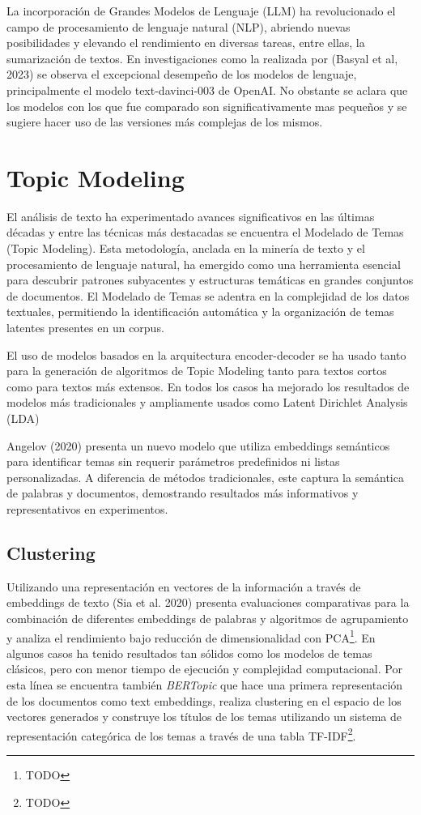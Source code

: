 La incorporación de Grandes Modelos de Lenguaje (LLM) ha revolucionado el campo de procesamiento de lenguaje natural (NLP), abriendo nuevas posibilidades y elevando el rendimiento en diversas tareas, entre ellas, la sumarización de textos. En investigaciones como la realizada por (Basyal et al, 2023)\cite{basyal2023text} se observa el excepcional desempeño de los modelos de lenguaje, principalmente el modelo text-davinci-003 de OpenAI\cite{openai}. No obstante se aclara que los modelos con los que fue comparado son significativamente mas peque\~nos y se sugiere hacer uso de las versiones más complejas de los mismos.

\section{Topic Modeling}

    El análisis de texto ha experimentado avances significativos en las últimas décadas y entre las técnicas más destacadas se encuentra el Modelado de Temas (Topic Modeling). Esta metodología, anclada en la minería de texto y el procesamiento de lenguaje natural, ha emergido como una herramienta esencial para descubrir patrones subyacentes y estructuras temáticas en grandes conjuntos de documentos. El Modelado de Temas se adentra en la complejidad de los datos textuales, permitiendo la identificación automática y la organización de temas latentes presentes en un corpus\cite{lda2003}.

    El uso de modelos basados en la arquitectura encoder-decoder se ha usado tanto para la generación de algoritmos de Topic Modeling tanto para textos cortos\cite{neuraltm} como para textos más extensos\cite{tminemb}. En todos los casos ha mejorado los resultados de modelos más tradicionales y ampliamente usados como Latent Dirichlet Analysis (LDA)\cite{lda2003}   

    Angelov (2020)\cite{angelov2020top2vec} presenta un nuevo modelo que utiliza embeddings semánticos para identificar temas sin requerir parámetros predefinidos ni listas personalizadas. A diferencia de métodos tradicionales, este captura la semántica de palabras y documentos, demostrando resultados más informativos y representativos en experimentos.

    \subsection{Clustering}
    Utilizando una representación en vectores de la información a través de embeddings de texto (Sia et al. 2020)\cite{sia2020tired} presenta evaluaciones comparativas para la combinación de diferentes embeddings de palabras y algoritmos de agrupamiento y analiza el rendimiento bajo reducción de dimensionalidad con PCA\footnote{TODO}. En algunos casos ha tenido resultados tan sólidos como los modelos de temas clásicos, pero con menor tiempo de ejecución y complejidad computacional. 
    Por esta línea se encuentra también \emph{BERTopic}\cite{bertopic} que hace una primera representación de los documentos como text embeddings, realiza clustering en el espacio de los vectores generados y construye los títulos de los temas utilizando un sistema de representación categórica de los temas a través de una tabla TF-IDF\footnote{TODO}.

